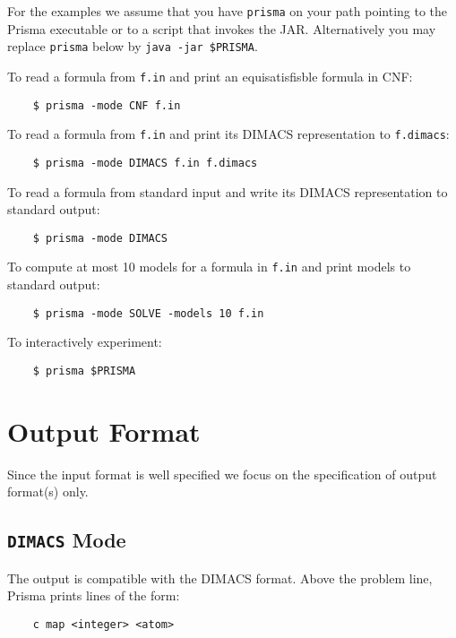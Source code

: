 \documentclass{llncs}
\begin{document}
For the examples we assume that you have \texttt{prisma} on your path pointing to the Prisma executable or to a script that invokes the JAR. Alternatively you may replace \texttt{prisma} below by \texttt{java -jar \$PRISMA}.

To read a formula from \texttt{f.in} and print an equisatisfisble formula in CNF:

	\begin{verbatim}
	$ prisma -mode CNF f.in
	\end{verbatim}

To read a formula from \texttt{f.in} and print its DIMACS representation to \texttt{f.dimacs}:

	\begin{verbatim}
	$ prisma -mode DIMACS f.in f.dimacs
	\end{verbatim}


To read a formula from standard input and write its DIMACS representation to standard output:

	\begin{verbatim}
	$ prisma -mode DIMACS
	\end{verbatim}
	
To compute at most 10 models for a formula in \texttt{f.in} and print models to standard output:

	\begin{verbatim}
	$ prisma -mode SOLVE -models 10 f.in
	\end{verbatim}

To interactively experiment:

	\begin{verbatim}
	$ prisma $PRISMA
	\end{verbatim}
	
\section{Output Format}
\label{sec:output}

Since the input format is well specified we focus on the specification of output format(s) only.

\subsection{\texttt{DIMACS} Mode}

The output is compatible with the DIMACS format. Above the problem line, Prisma prints lines of the form:

	\begin{verbatim}
	c map <integer> <atom>
	\end{verbatim}
\end{document}
